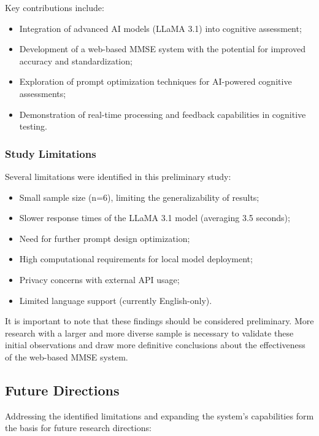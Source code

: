 Key contributions include:
\begin{itemize}
\item Integration of advanced AI models (LLaMA 3.1) into cognitive assessment;
\item Development of a web-based MMSE system with the potential for improved accuracy and standardization;
\item Exploration of prompt optimization techniques for AI-powered cognitive assessments;
\item Demonstration of real-time processing and feedback capabilities in cognitive testing.
\end{itemize}
\subsubsection{Study Limitations}
Several limitations were identified in this preliminary study:
\begin{itemize}
\item Small sample size (n=6), limiting the generalizability of results;
\item Slower response times of the LLaMA 3.1 model (averaging 3.5 seconds);
\item Need for further prompt design optimization;
\item High computational requirements for local model deployment;
\item Privacy concerns with external API usage;
\item Limited language support (currently English-only).
\end{itemize}

It is important to note that these findings should be considered preliminary. More research with a larger and more diverse sample is necessary to validate these initial observations and draw more definitive conclusions about the effectiveness of the web-based MMSE system.

\subsection{Future Directions}

Addressing the identified limitations and expanding the system's capabilities form the basis for future research directions:

